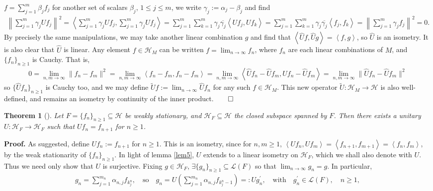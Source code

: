 \documentclass[11pt]{report}
\newcommand{\mc}[1]{\mathcal{#1}}
\newcommand{\ip}[2]{\left\langle#1,#2\right\rangle }
\newtheorem{theorem}{Theorem}[section]
\theoremstyle{definition}
\begin{document}
    $f=\sum_{j=1}^m\beta_jf_j$ for another set of scalars $\beta_j$, $1\leq
    j\leq m$, we write $\gamma_j:=\alpha_j-\beta_j$ and find
    \begin{align*}
        \left\|\sum_{j=1}^m\gamma_jUf_j\right\|^2=\ip{\sum_{j=1}^m\gamma_jUf_j}{\sum_{j=1}^m\gamma_jUf_j}=\sum_{j=1}^m\sum_{k=1}^m\gamma_j\overline{\gamma_j}\ip{Uf_j}{Uf_k}=\sum_{j=1}^m\sum_{k=1}^m\gamma_j\overline{\gamma_j}\ip{f_j}{f_k}=\left\|\sum_{j=1}^m\gamma_jf_j\right\|^2=0.
    \end{align*}
    By precisely the same manipulations, we may take another linear combination
    $g$ and find that $\ip{\hat{U}f}{\hat{U}g}=\ip{f}{g}$, so $\hat{U}$ is an
    isometry. It is also clear that $\hat{U}$ is linear. Any element
    $f\in\mc{H}_M$ can be written $f=\lim_{n\rightarrow\infty}f_n$, where $f_n$
    are each linear combinations of $M$, and $\{f_n\}_{n\geq 1}$ is Cauchy. That
    is,
    \begin{align*}
        0=\lim_{n,m\rightarrow\infty}\|f_n-f_m\|^2=\lim_{n,m\rightarrow\infty}\ip{f_n-f_m}{f_n-f_m}=\lim_{n,m\rightarrow\infty}\ip{\hat{U}f_n-\hat{U}f_m}{\hat{U}f_n-\hat{U}f_m}=\lim_{n,m\rightarrow\infty}\|\hat{U}f_n-\hat{U}f_m\|^2
    \end{align*}
    so $\{\hat{U}f_n\}_{n\geq 1}$ is Cauchy too, and we may define
    $\widetilde{U}f:=\lim_{n\rightarrow\infty}\hat{U}f_n$ for any such
    $f\in\mc{H}_M$. This new operator $\widetilde{U}:\mc{H}_M\rightarrow\mc{H}$
    is also well-defined, and remains an isometry by continuity of the inner
    product.\hfill{$\qed$}
    \begin{theorem}[{\cite[theorem 2.1.3]{Weber_2000}}]\label{thm2} Let
        $F=\{f_n\}_{n\geq 1}\subseteq\mc{H}$ be weakly stationary, and
        $\mc{H}_F\subseteq\mc{H}$ the closed subspace spanned by $F$. Then there
        exists a unitary $U:\mc{H}_F\rightarrow\mc{H}_F$ such that
        $Uf_n=f_{n+1}$ for $n\geq 1$.
    \end{theorem}
    \noindent\textbf{Proof.} As suggested, define $Uf_n:=f_{n+1}$ for $n\geq 1$.
    This is an isometry, since for $n,m\geq 1$,
    $\ip{Uf_n}{Uf_m}=\ip{f_{n+1}}{f_{m+1}}=\ip{f_n}{f_m}$, by the weak
    stationarity of $\{f_n\}_{n\geq 1}$. In light of lemma \ref{lem5}, $U$
    extends to a linear isometry on $\mc{H}_F$, which we shall also denote with
    $U$. Thus we need only show that $U$ is surjective. Fixing $g\in\mc{H}_F$,
    $\exists \{g_n\}_{n\geq 1}\subseteq\mc{L}(F)$ so that
    $\lim_{n\rightarrow\infty}g_n=g$. In particular,
    \begin{align*}
        g_n=\sum_{j=1}^{m_n}\alpha_{n,j}f_{k^n_j},\quad\text{so}\quad g_n=U\left(\sum_{j=1}^{m_n}\alpha_{n,j}f_{k^n_j-1}\right)=:Ug^\prime_n,\quad\text{with}\quad g^\prime_n\in\mc{L}(F),\quad n\geq 1,
    \end{align*}
\end{document}
